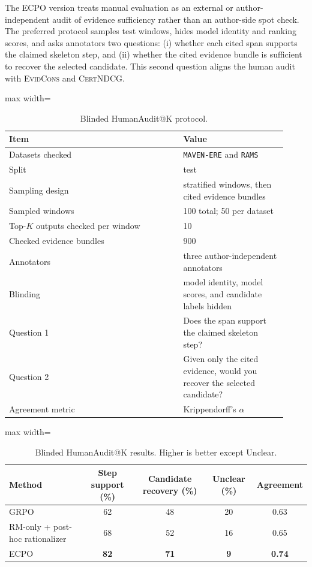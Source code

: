 \documentclass{article}
\newcommand{\ECPO}{\textsc{ECPO}}
\newcommand{\CertNDCG}{\textsc{CertNDCG}}
\newcommand{\EvidCons}{\textsc{EvidCons}}
\begin{document}
The ECPO version treats manual evaluation as an external or author-independent audit of evidence sufficiency rather than an author-side spot check. The preferred protocol samples test windows, hides model identity and ranking scores, and asks annotators two questions: (i) whether each cited span supports the claimed skeleton step, and (ii) whether the cited evidence bundle is sufficient to recover the selected candidate. This second question aligns the human audit with \EvidCons{} and \CertNDCG{}.

\begin{table}[t]
\centering
\caption{Blinded HumanAudit@K protocol.}
\label{tab:humancheck_setup}
\small
\setlength{\tabcolsep}{4pt}
\begin{adjustbox}{max width=\linewidth}
\begin{tabular}{p{0.58\linewidth}p{0.34\linewidth}}
\hline
Item & Value \\
\hline
Datasets checked & \texttt{MAVEN-ERE} and \texttt{RAMS} \\
Split & test \\
Sampling design & stratified windows, then cited evidence bundles \\
Sampled windows & 100 total; 50 per dataset \\
Top-$K$ outputs checked per window & 10 \\
Checked evidence bundles & 900 \\
Annotators & three author-independent annotators \\
Blinding & model identity, model scores, and candidate labels hidden \\
Question 1 & Does the span support the claimed skeleton step? \\
Question 2 & Given only the cited evidence, would you recover the selected candidate? \\
Agreement metric & Krippendorff's $\alpha$ \\
\hline
\end{tabular}
\end{adjustbox}
\end{table}

\begin{table}[t]
\centering
\caption{Blinded HumanAudit@K results. Higher is better except Unclear.}
\label{tab:humancheck}
\small
\setlength{\tabcolsep}{4pt}
\begin{adjustbox}{max width=\linewidth}
\begin{tabular}{lcccc}
\hline
Method & Step support (\%) & Candidate recovery (\%) & Unclear (\%) & Agreement \\
\hline
GRPO & 62 & 48 & 20 & 0.63 \\
RM-only + post-hoc rationalizer & 68 & 52 & 16 & 0.65 \\
\ECPO & \textbf{82} & \textbf{71} & \textbf{9} & \textbf{0.74} \\
\hline
\end{tabular}
\end{adjustbox}
\end{table}
\end{document}
